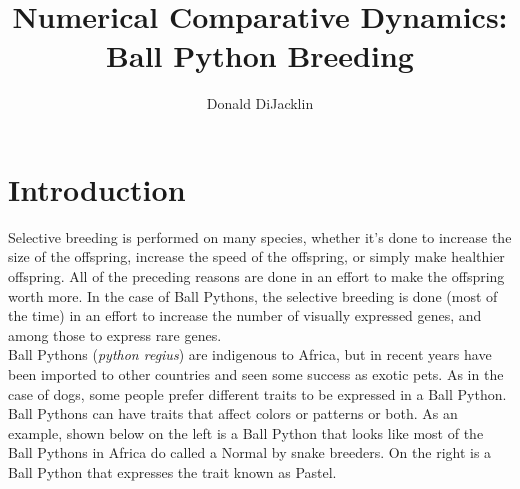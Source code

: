 \documentclass{article}
\begin{document}
\newcommand*{\be}{\mathbb{E}}
\newcommand*{\bv}{\mathbb{V}}
\lstset{showspaces = false, showstringspaces = false}
\linespread{2}
\title{Numerical Comparative Dynamics: Ball Python Breeding}
\author{Donald DiJacklin}
\maketitle

\section*{Introduction}
	\indent\indent Selective breeding is performed on many species, whether it's done to increase the size of the offspring, increase the speed of the offspring, or simply make healthier offspring. All of the preceding reasons are done in an effort to make the offspring worth more. In the case of Ball Pythons, the selective breeding is done (most of the time) in an effort to increase the number of visually expressed genes, and among those to express rare genes.\\
	\indent Ball Pythons (\textit{python regius}) are indigenous to Africa, but in recent years have been imported to other countries and seen some success as exotic pets. As in the case of dogs, some people prefer different traits to be expressed in a Ball Python. Ball Pythons can have traits that affect colors or patterns or both. As an example, shown below on the left is a Ball Python that looks like most of the Ball Pythons in Africa do called a Normal by snake breeders. On the right is a Ball Python that expresses the trait known as Pastel.
\end{document}

